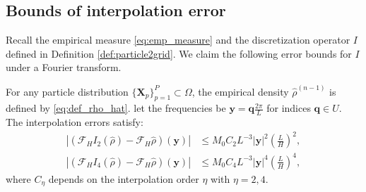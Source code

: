 \documentclass[review,onefignum,onetabnum]{siamart250211}
\begin{document}
\subsection{Bounds of interpolation error}

Recall the empirical measure \eqref{eq:emp_measure} and the discretization operator $I$ defined in Definition \ref{def:particle2grid}. We claim the following error bounds for $I$ under a Fourier transform.

\begin{lemma}
\label{Thm:P2G}
For any particle distribution \(\{\mathbf{X}_p\}_{p=1}^P \subset \Omega\), the empirical density \(\hat{\rho}^{(n-1)}\) is defined by \eqref{eq:def_rho_hat}. let the frequencies be \( \mathbf{y} = \mathbf{q} \frac{2\pi}{L} \) for indices \( \mathbf{q} \in U\). The interpolation errors satisfy:
\begin{align}
|(\mathcal{F}_H I_2(\hat{\rho}) - \mathcal{F}_H \hat{\rho})(\mathbf{y})| &\leq M_0 C_2 L^{-3} |\mathbf{y}|^2 \left(\frac{L}{H}\right)^2, \\
|(\mathcal{F}_H I_4(\hat{\rho}) - \mathcal{F}_H \hat{\rho})(\mathbf{y})| &\leq M_0 C_4 L^{-3} |\mathbf{y}|^4 \left(\frac{L}{H}\right)^4,
\end{align}
where \( C_{\eta} \) depends on the interpolation order \( \eta \) with $\eta=2, 4$.
\end{lemma}
\end{document}
